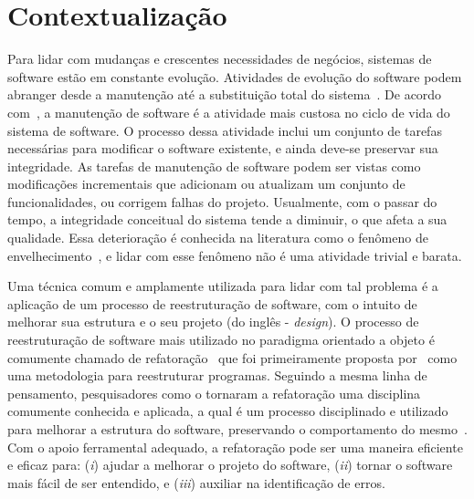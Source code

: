 
\section{Contextualização}\label{sec:contexto}


Para lidar com mudanças e crescentes necessidades de negócios, sistemas de software estão em constante evolução.
Atividades de evolução do software podem abranger desde a manutenção até a substituição total do sistema~\cite{seacord_2003}. 
De acordo com~, a manutenção de software é a atividade mais custosa no ciclo de vida do sistema de software. 
O processo dessa atividade inclui um conjunto de tarefas necessárias para modificar o software existente, e ainda deve-se preservar sua integridade.
As tarefas de manutenção de software podem ser vistas como modificações incrementais que adicionam ou atualizam um conjunto de funcionalidades, ou corrigem falhas do projeto.
Usualmente, com o passar do tempo, a integridade conceitual do sistema tende a diminuir, o que afeta a sua qualidade.
Essa deterioração é conhecida na literatura como o fenômeno de envelhecimento~\cite{Fowler1999}, e lidar com esse fenômeno não é uma atividade trivial e barata.

Uma técnica comum e amplamente utilizada para lidar com tal problema é a aplicação de um processo de reestruturação de software, com o intuito de melhorar sua estrutura e o seu projeto (do inglês - \emph{design}). O processo de reestruturação de software mais utilizado no paradigma orientado a objeto é comumente chamado de refatoração~\cite{OPDYKE_1992, Fowler1999, Mens04} que foi primeiramente proposta por~ como uma metodologia para reestruturar programas. Seguindo a mesma linha de pensamento, pesquisadores como o  tornaram a refatoração uma disciplina comumente conhecida e aplicada, a qual é um processo disciplinado e utilizado para melhorar a estrutura do software, preservando o comportamento do mesmo~\cite{Fowler1999}. Com o apoio ferramental adequado, a refatoração pode ser uma maneira eficiente e eficaz para: (\textit{i}) ajudar a melhorar o projeto do software, (\textit{ii}) tornar o software mais fácil de ser entendido, e (\textit{iii}) auxiliar na identificação de erros. %



